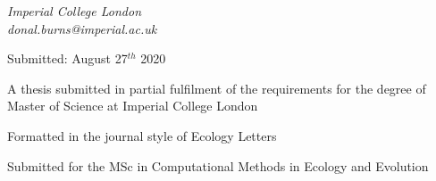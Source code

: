 \begin{titlepage}
	\vspace{0.5\baselineskip} %
	
	\textit{Imperial College London \\ donal.burns@imperial.ac.uk} %
	
	\vspace*{2\baselineskip} %
	
	
	
%	
%	
%	
%	
%	
%	
	

	
	
	
	\vspace{0.3\baselineskip} %
	
	Submitted: August 27$^{th}$ 2020 %
	
	

	\vspace{3cm}
	
	A thesis submitted in partial fulfilment of the requirements for the degree of
	Master of Science at Imperial College London
	\vspace{0.5\baselineskip}
	
	Formatted in the journal style of Ecology Letters	
	\vspace{0.5\baselineskip}
	
	Submitted for the MSc in Computational Methods in Ecology and Evolution
	
\end{titlepage}
